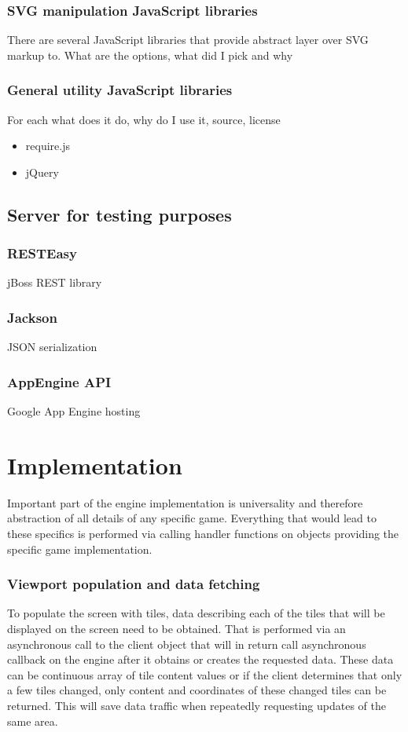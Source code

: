 \documentclass[11pt,oneside, final]{fithesis2}
\begin{document}
\subsection{SVG manipulation JavaScript libraries}
There are several JavaScript libraries that provide abstract layer over SVG markup to.
What are the options, what did I pick and why

\subsection{General utility JavaScript libraries}
For each what does it do, why do I use it, source, license
\begin{itemize}
	\item require.js
	\item jQuery
\end{itemize}

\section{Server for testing purposes}
\subsection{RESTEasy}
jBoss REST library

\subsection{Jackson}
JSON serialization

\subsection{AppEngine API}
Google App Engine hosting

\chapter{Implementation}
\label{implementation}
Important part of the engine implementation is universality and therefore abstraction of all details of any specific game. Everything that would lead to these specifics is performed via calling handler functions on objects providing the specific game implementation.

\subsection{Viewport population and data fetching}
To populate the screen with tiles, data describing each of the tiles that will be displayed on the screen need to be obtained. That is performed via an asynchronous call to the client object that will in return call asynchronous callback on the engine after it obtains or creates the requested data. These data can be continuous array of tile content values or if the client determines that only a few tiles changed, only content and coordinates of these changed tiles can be returned. This will save data traffic when repeatedly requesting updates of the same area.
\end{document}
